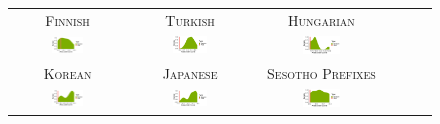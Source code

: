 \documentclass[11pt,letterpaper]{article}
\begin{document}
\begin{figure}
    \centering
    \begin{tabular}{cccccc}
    \textsc{Finnish} & \textsc{Turkish} & \textsc{Hungarian} \\
        \includegraphics[width=0.3\textwidth]{figures/finnish_verbs/suffixes-byMorphemes-auc-hist-heldout-Coarse-FineSurprisal-optimized.pdf}
        &
    \includegraphics[width=0.3\textwidth]{figures/turkish_verbs/suffixes-byMorphemes-auc-hist-heldout-Coarse-FineSurprisal-optimized.pdf}
    &
    \includegraphics[width=0.3\textwidth]{figures/hungarian_verbs/suffixes-byMorphemes-auc-hist-heldout-Coarse-FineSurprisal-optimized.pdf}
    \\
    \textsc{Korean} & \textsc{Japanese} & \textsc{Sesotho Prefixes} \\
    \includegraphics[width=0.3\textwidth]{figures/korean/suffixes-byMorphemes-auc-hist-heldout-Coarse-FineSurprisal-optimized.pdf}
    &
        \includegraphics[width=0.3\textwidth]{figures/japanese/suffixes-byMorphemes-auc-hist-heldout-Coarse-FineSurprisal-optimized.pdf}
        &
            \includegraphics[width=0.3\textwidth]{figures/sesotho_prefixes/suffixes-byMorphemes-auc-hist-heldout-Coarse-FineSurprisal-optimized.pdf}

\end{tabular}
\end{figure}
\end{document}
